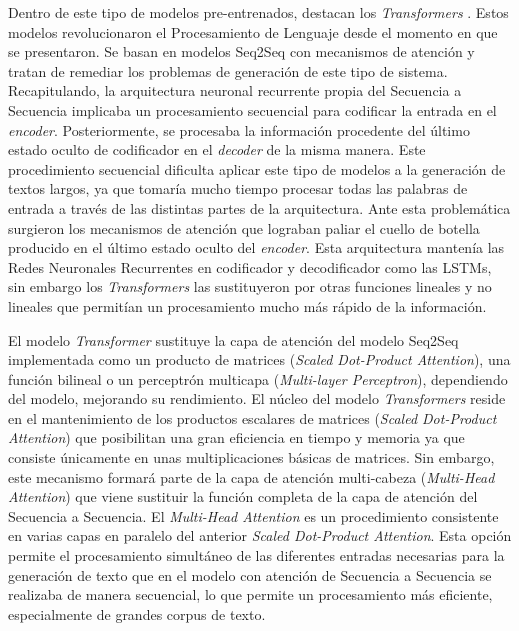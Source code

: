 Dentro de este tipo de modelos pre-entrenados, destacan los \textit{Transformers} \citep{vaswani2017attention}. Estos modelos revolucionaron el Procesamiento de Lenguaje desde el momento en que se presentaron. Se basan en modelos Seq2Seq con mecanismos de atención y tratan de remediar los problemas de generación de este tipo de sistema. Recapitulando, la arquitectura neuronal recurrente propia del Secuencia a Secuencia implicaba un procesamiento secuencial para codificar la entrada en el \textit{encoder}. Posteriormente, se procesaba la información procedente del último estado oculto de codificador en el \textit{decoder} de la misma manera. Este procedimiento secuencial dificulta aplicar este tipo de modelos a la generación de textos largos, ya que tomaría mucho tiempo procesar todas las palabras de entrada a través de las distintas partes de la arquitectura. Ante esta problemática surgieron los mecanismos de atención que lograban paliar el cuello de botella producido en el último estado oculto del \textit{encoder}. Esta arquitectura mantenía las Redes Neuronales Recurrentes en codificador y decodificador como las LSTMs, sin embargo los \textit{Transformers} las sustituyeron por otras funciones lineales y no lineales que permitían un procesamiento mucho más rápido de la información.



El modelo \textit{Transformer} sustituye la capa de atención del modelo Seq2Seq implementada como un producto de matrices (\textit{Scaled Dot-Product Attention}), una función bilineal \citep{luong2015effective} o un perceptrón multicapa (\textit{Multi-layer Perceptron}), dependiendo del modelo, mejorando su rendimiento. El núcleo del modelo \textit{Transformers} reside en el mantenimiento de los productos escalares de matrices (\textit{Scaled Dot-Product Attention}) que posibilitan una gran eficiencia en tiempo y memoria ya que consiste únicamente en unas multiplicaciones básicas de matrices. Sin embargo, este mecanismo formará parte de la capa de atención multi-cabeza (\textit{Multi-Head Attention}) que viene sustituir la función completa de la capa de atención del Secuencia a Secuencia. 
El \textit{Multi-Head Attention} es un procedimiento consistente en varias capas en paralelo del anterior \textit{Scaled Dot-Product Attention}. Esta opción permite el procesamiento simultáneo de las diferentes entradas necesarias para la generación de texto que en el modelo con atención de Secuencia a Secuencia se realizaba de manera secuencial, lo que permite un procesamiento más eficiente, especialmente de grandes corpus de texto.


